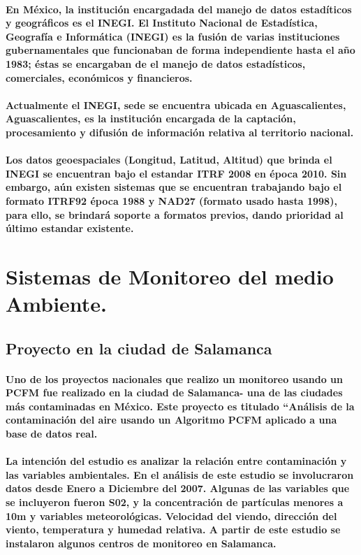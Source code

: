  \paragraph{En México, la institución encargadada del manejo de datos estadíticos y geográficos es el INEGI. El Instituto Nacional de Estadística, Geografía e Informática (INEGI) es la fusión de varias instituciones gubernamentales que funcionaban de forma independiente hasta el año 1983; éstas se encargaban de el manejo de datos estadísticos, comerciales, económicos y financieros.}

  \paragraph{Actualmente el INEGI, sede se encuentra ubicada en Aguascalientes, Aguascalientes, es la institución encargada de la captación, procesamiento y difusión de información relativa al territorio nacional. \cite{6}}

  \paragraph{Los datos geoespaciales (Longitud, Latitud, Altitud) que brinda el INEGI se encuentran bajo el estandar \textbf{ITRF 2008} en época 2010. Sin embargo, aún existen sistemas que se encuentran trabajando bajo el formato ITRF92 época 1988 y NAD27 (formato usado hasta 1998), para ello, se brindará soporte a formatos previos, dando prioridad al último estandar existente.} 

\section {Sistemas de Monitoreo del medio Ambiente.}
  \subsection {Proyecto en la ciudad de Salamanca}
    \paragraph {Uno de los proyectos nacionales que realizo un monitoreo usando un PCFM fue realizado en la ciudad de Salamanca- una de las ciudades más contaminadas en México. Este proyecto es titulado “Análisis de la contaminación del aire usando un Algoritmo PCFM  aplicado a una base de datos real.}

    \paragraph{La intención del estudio es analizar la relación entre contaminación y las variables ambientales. En el análisis de este estudio se involucraron datos desde Enero a Diciembre del 2007. Algunas de las variables que se incluyeron fueron S02, y la concentración de partículas menores a 10m y variables meteorológicas. Velocidad del viendo, dirección del viento, temperatura y humedad relativa. A partir de este estudio se instalaron algunos centros de monitoreo en Salamanca.}

